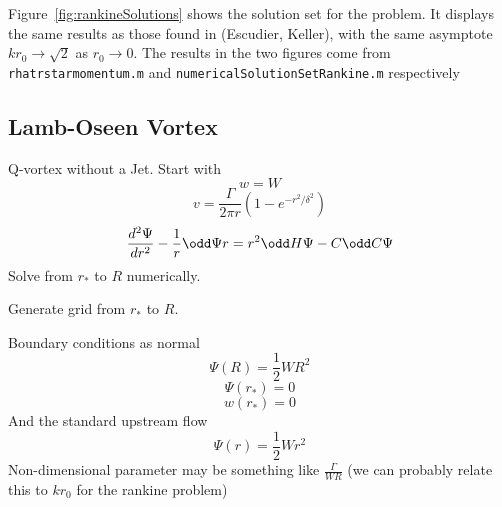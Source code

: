 \documentclass{X:/Documents/Coding/Latex/myreport}
\begin{document}
Figure~\ref{fig:rankineSolutions} shows the solution set for the problem. It displays the same results as those found in (Escudier, Keller), with the same asymptote $kr_0 \to \sqrt{2}$ as $r_0 \to 0$. The results in the two figures come from \verb|rhatrstarmomentum.m| and \verb|numericalSolutionSetRankine.m| respectively
%

%

\subsection{Lamb-Oseen Vortex}
Q-vortex without a Jet.
Start with 
\[w = W\]
\[v = \frac{\Gamma}{2\pi r} \left(1 - e^{-r^2/\delta^2}\right)\]
\[\frac{d^2\Psi}{dr^2} - \frac1r \odd \Psi r = r^2 \odd H\Psi - C \odd C\Psi \]
Solve from $r_*$ to $R$ numerically.

Generate grid from $r_*$ to $R$.

Boundary conditions as normal
\[\Psi(R) = \frac12 WR^2\]
\[\Psi(r_*) = 0\]
\[w(r_*) = 0\]
And the standard upstream flow 
\[\Psi(r)  =\frac12 Wr^2\]
Non-dimensional parameter may be something like $\frac{\Gamma}{WR}$ (we can probably relate this to $kr_0$ for the rankine problem)
\end{document}
